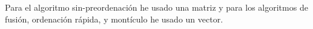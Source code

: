 Para el algoritmo sin-preordenación he usado una matriz y para los algoritmos de fusión, ordenación rápida, y montículo he usado un vector.
